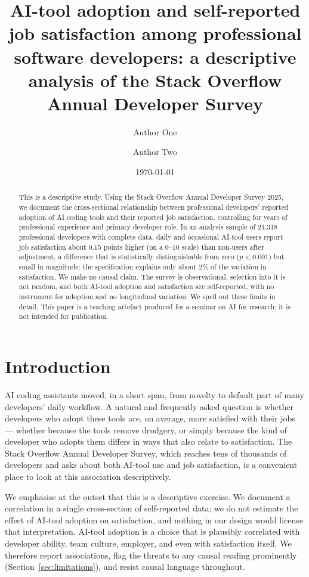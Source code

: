 \documentclass[11pt]{article}
\title{AI-tool adoption and self-reported job satisfaction among professional
software developers: a descriptive analysis of the Stack Overflow Annual
Developer Survey}
\author[1]{Author One}
\author[1]{Author Two}
\affil[1]{Universidade Cat\'olica Portuguesa}
\date{\today}
\begin{document}
\maketitle

\begin{abstract}
This is a descriptive study. Using the Stack Overflow Annual Developer
Survey 2025, we document the cross-sectional relationship between
professional developers' reported adoption of AI coding tools and their
reported job satisfaction, controlling for years of professional experience
and primary developer role. In an analysis sample of 24{,}318
professional developers with complete data, daily and occasional AI-tool
users report job satisfaction about $0.15$ points higher (on a $0$--$10$
scale) than non-users after adjustment, a difference that is statistically
distinguishable from zero ($p < 0.001$) but small in magnitude: the
specification explains only about $2\%$ of the variation in satisfaction.
We make no causal claim. The survey is observational, selection into it is
not random, and both AI-tool adoption and satisfaction are self-reported,
with no instrument for adoption and no longitudinal variation. We spell out
these limits in detail. This paper is a teaching artefact produced for a
seminar on AI for research; it is not intended for publication.
\end{abstract}

\section{Introduction}
AI coding assistants moved, in a short span, from novelty to default part
of many developers' daily workflow. A natural and frequently asked question
is whether developers who adopt these tools are, on average, more satisfied
with their jobs --- whether because the tools remove drudgery, or simply
because the kind of developer who adopts them differs in ways that also
relate to satisfaction. The Stack Overflow Annual Developer Survey, which
reaches tens of thousands of developers and asks about both AI-tool use and
job satisfaction, is a convenient place to look at this association
descriptively.

We emphasise at the outset that this is a descriptive exercise. We document
a correlation in a single cross-section of self-reported data; we do not
estimate the effect of AI-tool adoption on satisfaction, and nothing in our
design would license that interpretation. AI-tool adoption is a choice that
is plausibly correlated with developer ability, team culture, employer, and
even with satisfaction itself. We therefore report associations, flag the
threats to any causal reading prominently (Section~\ref{sec:limitations}),
and resist causal language throughout.
\end{document}
